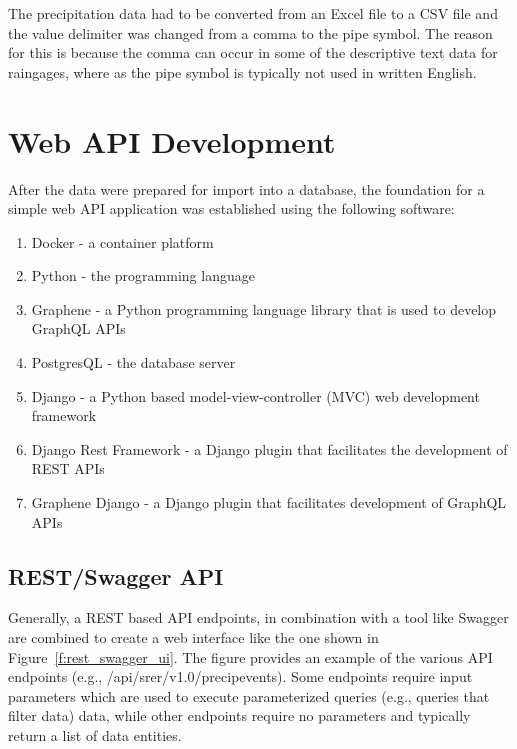 The precipitation data had to be converted from an Excel file to a CSV file 
and the value delimiter was changed from a comma to the pipe symbol.  The 
reason for this is because the comma can occur in some of the descriptive text 
data for raingages, where as the pipe symbol is typically not used in written 
English.

\section{Web API Development}
After the data were prepared for import into a database, the foundation for a 
simple web API application was established using the following software:

\begin{enumerate}
  \item Docker - a container platform\cite{hid505Docker2018}
  \item Python - the programming language
  \item Graphene - a Python programming language library that is used to 
  develop GraphQL APIs
  \item PostgresQL - the database server
  \item Django - a Python based model-view-controller (MVC) web development 
  framework
  \item Django Rest Framework - a Django plugin that facilitates the 
  development of REST APIs
  \item Graphene Django - a Django plugin that facilitates development of 
  GraphQL APIs
\end{enumerate}

\subsection{REST/Swagger API}
Generally, a REST based API endpoints, in combination with a tool like Swagger 
are combined to create a web interface like the one shown in 
Figure~\ref{f:rest_swagger_ui}.  The figure provides an example of the various 
API endpoints (e.g., /api/srer/v1.0/precipevents).  Some endpoints require 
input parameters which are used to execute parameterized queries (e.g., 
queries that filter data) data, while other endpoints require no parameters 
and typically return a list of data entities.

